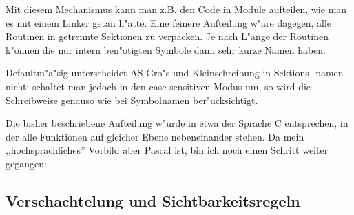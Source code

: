 \documentclass[12pt,a4paper,twoside]{report}
\begin{document}
Mit diesem Mechanismus kann man z.B. den Code in Module aufteilen, wie man
es mit einem Linker getan h"atte.  Eine feinere Aufteilung w"are dagegen,
alle Routinen in getrennte Sektionen zu verpacken.  Je nach L"ange der
Routinen k"onnen die nur intern ben"otigten Symbole dann sehr kurze Namen
haben.
\par
Defaultm"a"sig unterscheidet AS Gro"s-und Kleinschreibung in Sektions-
namen nicht; schaltet man jedoch in den case-sensitiven Modus um, so
wird die Schreibweise genauso wie bei Symbolnamen ber"ucksichtigt.
\par
Die bisher beschriebene Aufteilung w"urde in etwa der Sprache C entsprechen,
in der alle Funktionen auf gleicher Ebene nebeneinander stehen.  Da mein
,,hochsprachliches'' Vorbild aber Pascal ist, bin ich noch einen Schritt
weiter gegangen:


\subsection{Verschachtelung und Sichtbarkeitsregeln}
\end{document}
